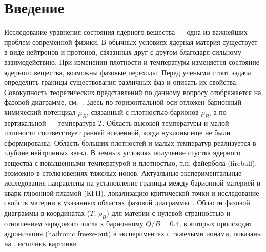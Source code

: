 \chapter*{Введение}\label{sec:secIntro}


Исследование уравнения состояния ядерного вещества --- одна из важнейших проблем современной физики. В обычных условиях ядерная материя существует в виде нейтронов и протонов, связанных друг с другом благодаря сильному взаимодействию. При изменении плотности и температуры изменяется состояние ядерного вещества, возможны фазовые переходы. Перед учеными стоит задача определить границы существования различных фаз и описать их свойства. Совокупность теоретических представлений по данному вопросу отображается на фазовой диаграмме, см.~. Здесь по горизонтальной оси отложен барионный химический потенциал $\mu_{B}$, связанный с плотностью барионов $\rho_{B}$, а по вертикальной --- температура $T$. Область высокой температуры и малой плотности соответствует ранней вселенной, когда нуклоны еще не были сформированы. Область больших плотностей и малых температур реализуется в глубине нейтронных звезд. В земных условиях получение сгустка ядерного вещества с повышенными температурой и плотностью, т.н. файербола (fireball), возможно в столкновениях тяжелых ионов. Актуальные экспериментальные исследования направлены на установление границы между барионной материей и кварк-глюонной плазмой (КГП), локализацию критической точки и исследование свойств материи в указанных областях фазовой диаграммы~\cite{CBMBook}. Области фазовой диаграммы в координатах ($T$, $\rho_{B}$) для материи с нулевой странностью и отношением зарядового числа к барионному $Q/B=0.4$, в которых происходит адронизация (hadronic freeze-out) в экспериментах с тяжелыми ионами, показаны на . \cite{} \todo источник картинки


